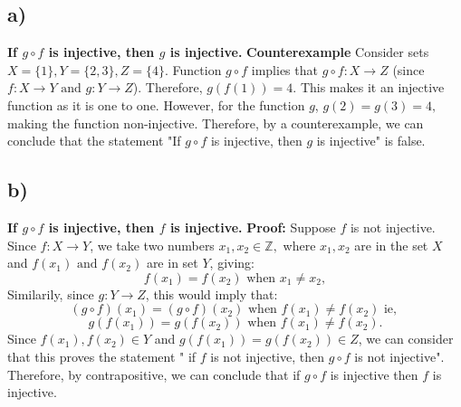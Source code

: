 \documentclass{article}
\begin{document}
\subsection{a)}
\textbf{ If $g \circ f$ is injective, then $g$ is injective.}
\newline
\newline
\textbf{ Counterexample }
\newline
\newline
Consider sets $X = \{1\}, Y = \{2, 3\}, Z = \{4\}.$
\newline
\newline
Function $g \circ f$ implies that $g \circ f: X \rightarrow Z$ (since $f: X \rightarrow Y \text{ and } g: Y \rightarrow Z$). Therefore, $g(f(1)) = 4.$
\newline
This makes it an injective function as it is one to one.
\newline
\newline
However, for the function $g$, $g(2) = g(3) = 4, $ making the function non-injective.
\newline
\newline
Therefore, by a counterexample, we can conclude that the statement "If $g \circ f$ is injective, then $g$ is injective" is false.
\newpage
\subsection{b)}
\textbf{ If $g \circ f$ is injective, then $f$ is injective. }
\newline
\newline
\textbf{Proof: } Suppose $f$ is not injective. 
Since $f: X \rightarrow Y$, we take two numbers $x_1, x_2 \in \mathbb{Z},$ where $x_1, x_2$ are in the set $X$ and $f(x_1) \text{ and } f(x_2)$ are in set $Y$, giving:
$$f(x_1) = f(x_2) \text{ when } x_1 \not = x_2,$$
Similarily, since $g: Y \rightarrow Z$, this would imply that:
$$(g \circ f)(x_1) = (g \circ f)(x_2) \text{ when } f(x_1) \not = f(x_2) \text{ ie, }$$
$$g(f(x_1)) = g(f(x_2)) \text{ when } f(x_1) \not = f(x_2).$$
\newline
Since $f(x_1), f(x_2) \in Y$ and $g(f(x_1)) = g(f(x_2)) \in Z$, we can consider that this proves the statement " if $f$ is not injective, then $g \circ f$ is not injective".
\newline
\newline
Therefore, by contrapositive, we can conclude that if $g \circ f$ is injective then $f$ is injective.
\newpage
\end{document}
